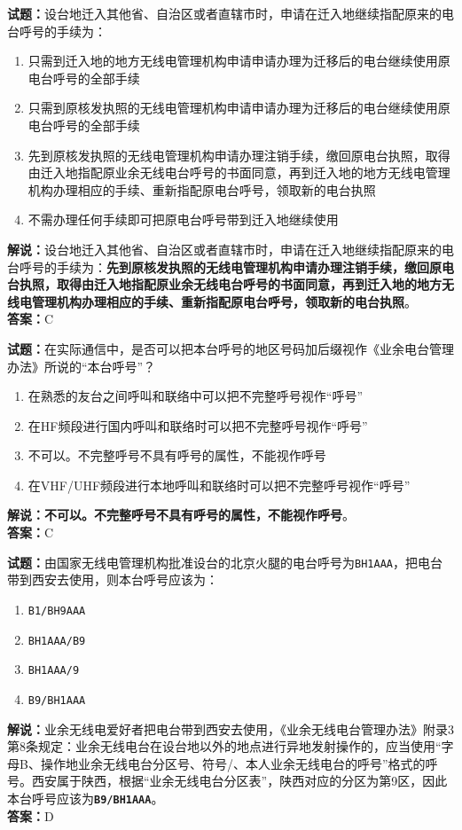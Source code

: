 \documentclass{ctexbook}
\begin{document}
\bigskip

\noindent\textbf{试题：}设台地迁入其他省、自治区或者直辖市时，申请在迁入地继续指配原来的电台呼号的手续为：
\begin{enumerate}[leftmargin=3em]
  \item 只需到迁入地的地方无线电管理机构申请申请办理为迁移后的电台继续使用原电台呼号的全部手续
  \item 只需到原核发执照的无线电管理机构申请申请办理为迁移后的电台继续使用原电台呼号的全部手续
  \item 先到原核发执照的无线电管理机构申请办理注销手续，缴回原电台执照，取得由迁入地指配原业余无线电台呼号的书面同意，再到迁入地的地方无线电管理机构办理相应的手续、重新指配原电台呼号，领取新的电台执照
  \item 不需办理任何手续即可把原电台呼号带到迁入地继续使用
\end{enumerate}
\noindent\textbf{解说：}设台地迁入其他省、自治区或者直辖市时，申请在迁入地继续指配原来的电台呼号的手续为：\textbf{先到原核发执照的无线电管理机构申请办理注销手续，缴回原电台执照，取得由迁入地指配原业余无线电台呼号的书面同意，再到迁入地的地方无线电管理机构办理相应的手续、重新指配原电台呼号，领取新的电台执照}。\\\noindent\textbf{答案：}C

\bigskip

\noindent\textbf{试题：}在实际通信中，是否可以把本台呼号的地区号码加后缀视作《业余电台管理办法》所说的“本台呼号”？
\begin{enumerate}[leftmargin=3em]
  \item 在熟悉的友台之间呼叫和联络中可以把不完整呼号视作“呼号”
  \item 在HF频段进行国内呼叫和联络时可以把不完整呼号视作“呼号”
  \item 不可以。不完整呼号不具有呼号的属性，不能视作呼号
  \item 在VHF/UHF频段进行本地呼叫和联络时可以把不完整呼号视作“呼号”
\end{enumerate}
\textbf{解说：不可以。不完整呼号不具有呼号的属性，不能视作呼号}。\\\noindent\textbf{答案：}C

\bigskip

\noindent\textbf{试题：}由国家无线电管理机构批准设台的北京火腿的电台呼号为\texttt{BH1AAA}，把电台带到西安去使用，则本台呼号应该为：
\begin{enumerate}[leftmargin=3em]
  \item \texttt{B1/BH9AAA}
  \item \texttt{BH1AAA/B9}
  \item \texttt{BH1AAA/9}
  \item \texttt{B9/BH1AAA}
\end{enumerate}
\noindent\textbf{解说：}业余无线电爱好者把电台带到西安去使用，《业余无线电台管理办法》附录3第8条规定：业余无线电台在设台地以外的地点进行异地发射操作的，应当使用“字母B、操作地业余无线电台分区号、符号/、本人业余无线电台的呼号”格式的呼号。西安属于陕西，根据“业余无线电台分区表”，陕西对应的分区为第9区，因此本台呼号应该为\texttt{\textbf{B9/BH1AAA}}。\\\noindent\textbf{答案：}D
\end{document}
